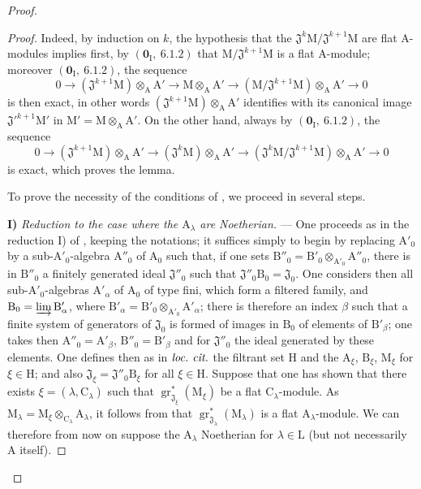 \begin{proof}
\begin{proof}

Indeed, by induction on $k$, the hypothesis that the $\mathfrak{J}^k\mathrm{M}/\mathfrak{J}^{k+1}\mathrm{M}$ are flat A-modules implies first, by $(\mathbf{0}_\mathrm{I},~6.1.2)$ that $\mathrm{M}/\mathfrak{J}^{k+1}\mathrm{M}$ is a flat A-module; moreover $(\mathbf{0}_\mathrm{I},~6.1.2)$, the sequence
\[
  0\to(\mathfrak{J}^{k+1}\mathrm{M})\otimes_\mathrm{A}\mathrm{A}'\to\mathrm{M}\otimes_\mathrm{A}\mathrm{A}'\to(\mathrm{M}/\mathfrak{J}^{k+1}\mathrm{M})\otimes_\mathrm{A}\mathrm{A}'\to 0
\]
is then exact, in other words $(\mathfrak{J}^{k+1}\mathrm{M})\otimes_\mathrm{A}\mathrm{A}'$ identifies with its canonical image $\mathfrak{J}'^{k+1}\mathrm{M}'$ in $\mathrm{M}'=\mathrm{M}\otimes_\mathrm{A}\mathrm{A}'$. On the other hand, always by $(\mathbf{0}_\mathrm{I},~6.1.2)$, the sequence
\[
  0\to(\mathfrak{J}^{k+1}\mathrm{M})\otimes_\mathrm{A}\mathrm{A}'\to(\mathfrak{J}^k\mathrm{M})\otimes_\mathrm{A}\mathrm{A}'\to(\mathfrak{J}^k\mathrm{M}/\mathfrak{J}^{k+1}\mathrm{M})\otimes_\mathrm{A}\mathrm{A}'\to 0
\]
is exact, which proves the lemma.

To prove the necessity of the conditions of , we proceed in several steps.

\medskip
\noindent\textbf{I)} \emph{Reduction to the case where the $\mathrm{A}_\lambda$ are Noetherian.} --- One proceeds as in the reduction I) of , keeping the notations; it suffices simply to begin by replacing $\mathrm{A}'_0$ by a sub-$\mathrm{A}'_0$-algebra $\mathrm{A}''_0$ of $\mathrm{A}_0$ such that, if one sets $\mathrm{B}''_0=\mathrm{B}'_0\otimes_{\mathrm{A}'_0}\mathrm{A}''_0$, there is in $\mathrm{B}''_0$ a finitely generated ideal $\mathfrak{J}''_0$ such that $\mathfrak{J}''_0\mathrm{B}_0=\mathfrak{J}_0$. One considers then all sub-$\mathrm{A}'_0$-algebras $\mathrm{A}'_\alpha$ of $\mathrm{A}_0$ of type fini, which form a filtered family, and $\mathrm{B}_0=\varinjlim\mathrm{B}'_\alpha$, where $\mathrm{B}'_\alpha=\mathrm{B}'_0\otimes_{\mathrm{A}'_0}\mathrm{A}'_\alpha$; there is therefore an index $\beta$ such that a finite system of generators of $\mathfrak{J}_0$ is formed of images in $\mathrm{B}_0$ of elements of $\mathrm{B}'_\beta$; one takes then $\mathrm{A}''_0=\mathrm{A}'_\beta$, $\mathrm{B}''_0=\mathrm{B}'_\beta$ and for $\mathfrak{J}''_0$ the ideal generated by these elements. One defines then as in $\emph{loc.\ cit.}$ the filtrant set $\mathrm{H}$ and the $\mathrm{A}_\xi$, $\mathrm{B}_\xi$, $\mathrm{M}_\xi$ for $\xi\in\mathrm{H}$; and also $\mathfrak{J}_\xi=\mathfrak{J}''_0\mathrm{B}_\xi$ for all $\xi\in\mathrm{H}$. Suppose that one has shown that there exists $\xi=(\lambda,\mathrm{C}_\lambda)$ such that $\operatorname{gr}^*_{\mathfrak{J}_\xi}(\mathrm{M}_\xi)$ be a flat $\mathrm{C}_\lambda$-module. As $\mathrm{M}_\lambda=\mathrm{M}_\xi\otimes_{\mathrm{C}_\lambda}\mathrm{A}_\lambda$, it follows from  that $\operatorname{gr}^*_{\mathfrak{J}_\lambda}(\mathrm{M}_\lambda)$ is a flat $\mathrm{A}_\lambda$-module. We can therefore from now on suppose the $\mathrm{A}_\lambda$ Noetherian for $\lambda\in\mathrm{L}$ (but not necessarily $\mathrm{A}$ itself).


\end{proof}
\end{proof}
